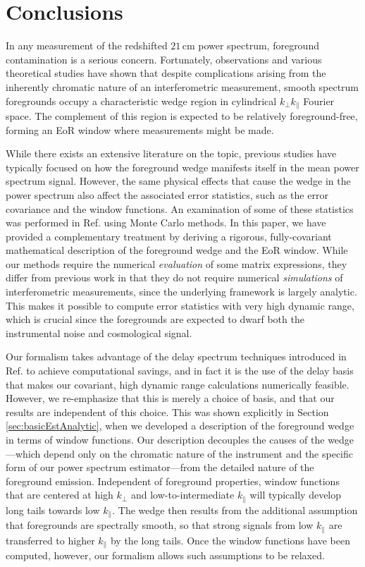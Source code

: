 \documentclass[twocolumn,aps,prd,nofootinbib,showpacs]{revtex4-1}
\begin{document}
\section{Conclusions}
\label{sec:Conclusions}
In any measurement of the redshifted $21\,\textrm{cm}$ power spectrum, foreground contamination is a serious concern.  Fortunately, observations and various theoretical studies have shown that despite complications arising from the inherently chromatic nature of an interferometric measurement, smooth spectrum foregrounds occupy a characteristic wedge region in cylindrical $k_\perp k_\parallel$ Fourier space.  The complement of this region is expected to be relatively foreground-free, forming an EoR window where measurements might be made.

While there exists an extensive literature on the topic, previous studies have typically focused on how the foreground wedge manifests itself in the mean power spectrum signal.  However, the same physical effects that cause the wedge in the power spectrum also affect the associated error statistics, such as the error covariance and the window functions.  An examination of some of these statistics was performed in Ref. \cite{Trott2012} using Monte Carlo methods.  In this paper, we have provided a complementary treatment by deriving a rigorous, fully-covariant mathematical description of the foreground wedge and the EoR window.  While our methods require the numerical \emph{evaluation} of some matrix expressions, they differ from previous work in that they do not require numerical \emph{simulations} of interferometric measurements, since the underlying framework is largely analytic.  This makes it possible to compute error statistics with very high dynamic range, which is crucial since the foregrounds are expected to dwarf both the instrumental noise and cosmological signal.

Our formalism takes advantage of the delay spectrum techniques introduced in Ref. \cite{Parsons2012b} to achieve computational savings, and in fact it is the use of the delay basis that makes our covariant, high dynamic range calculations numerically feasible.  However, we re-emphasize that this is merely a choice of basis, and that our results are independent of this choice.  This was shown explicitly in Section \ref{sec:basicEstAnalytic}, when we developed a description of the foreground wedge in terms of window functions.  Our description decouples the causes of the wedge---which depend only on the chromatic nature of the instrument and the specific form of our power spectrum estimator---from the detailed nature of the foreground emission.  Independent of foreground properties, window functions that are centered at high $k_\perp$ and low-to-intermediate $k_\parallel$ will typically develop long tails towards low $k_\parallel$.  The wedge then results from the additional assumption that foregrounds are spectrally smooth, so that strong signals from low $k_\parallel$ are transferred to higher $k_\parallel$ by the long tails.  Once the window functions have been computed, however, our formalism allows such assumptions to be relaxed.
\end{document}
